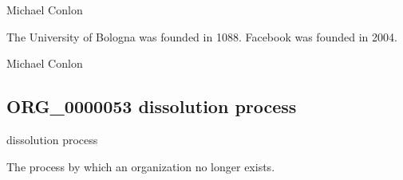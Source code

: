 \documentclass[letterpaper,10pt,english]{sphinxmanual}
\begin{document}
\begin{sphinxShadowBox}

\sphinxAtStartPar
Michael Conlon 
\end{sphinxShadowBox}

\begin{sphinxShadowBox}

\sphinxAtStartPar
The University of Bologna was founded in 1088.  Facebook was founded in 2004.
\end{sphinxShadowBox}

\begin{sphinxShadowBox}

\sphinxAtStartPar
Michael Conlon 
\end{sphinxShadowBox}
\begin{quote}

\ignorespaces \end{quote}


\subsection{ORG\_0000053 \sphinxhyphen{} dissolution process}
\label{\detokenize{doc-ORG_0000053:org-0000053-dissolution-process}}\label{\detokenize{doc-ORG_0000053:index-0}}\label{\detokenize{doc-ORG_0000053::doc}}
\begin{sphinxShadowBox}

\sphinxAtStartPar
dissolution process
\end{sphinxShadowBox}

\begin{sphinxShadowBox}

\sphinxAtStartPar
{\hyperref[\detokenize{doc-BFO_0000015::doc}]{}}
\end{sphinxShadowBox}

\begin{sphinxShadowBox}

\sphinxAtStartPar
The process by which an organization no longer exists.
\end{sphinxShadowBox}
\end{document}

